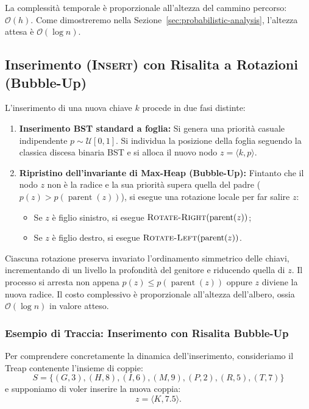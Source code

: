 La complessit\`a temporale \`e proporzionale all'altezza del cammino percorso: $\mathcal{O}(h)$. Come dimostreremo nella Sezione~\ref{sec:probabilistic-analysis}, l'altezza attesa \`e $\mathcal{O}(\log n)$.

\FloatBarrier
\subsection{Inserimento (\textsc{Insert}) con Risalita a Rotazioni (Bubble-Up)}
L'inserimento di una nuova chiave $k$ procede in due fasi distinte:
\begin{enumerate}
    \item \textbf{Inserimento BST standard a foglia:} Si genera una priorit\`a casuale indipendente $p \sim \mathcal{U}[0, 1]$. Si individua la posizione della foglia seguendo la classica discesa binaria BST e si alloca il nuovo nodo $z = \langle k, p \rangle$.
    \item \textbf{Ripristino dell'invariante di Max-Heap (Bubble-Up):} Fintanto che il nodo $z$ non \`e la radice e la sua priorit\`a supera quella del padre ($p(z) > p(\operatorname{parent}(z))$), si esegue una rotazione locale per far salire $z$:
    \begin{itemize}
        \item Se $z$ \`e figlio sinistro, si esegue $\textsc{Rotate-Right}(\operatorname{parent}(z))$;
        \item Se $z$ \`e figlio destro, si esegue $\textsc{Rotate-Left}(\operatorname{parent}(z))$.
    \end{itemize}
\end{enumerate}
Ciascuna rotazione preserva invariato l'ordinamento simmetrico delle chiavi, incrementando di un livello la profondit\`a del genitore e riducendo quella di $z$. Il processo si arresta non appena $p(z) \le p(\operatorname{parent}(z))$ oppure $z$ diviene la nuova radice. Il costo complessivo \`e proporzionale all'altezza dell'albero, ossia $\mathcal{O}(\log n)$ in valore atteso.

\subsubsection{Esempio di Traccia: Inserimento con Risalita Bubble-Up}
Per comprendere concretamente la dinamica dell'inserimento, consideriamo il Treap contenente l'insieme di coppie:
\begin{equation}
  S = \{ (G, 3), (H, 8), (I, 6), (M, 9), (P, 2), (R, 5), (T, 7) \}
\end{equation}
e supponiamo di voler inserire la nuova coppia:
\begin{equation}
  z = \langle K, 7.5 \rangle.
\end{equation}

